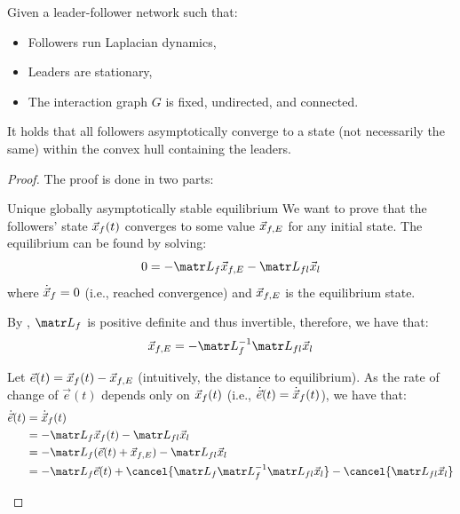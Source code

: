 \begin{theorem} \label{th:containment_optimality} 
    Given a leader-follower network such that:
    \begin{itemize}
        \item Followers run Laplacian dynamics,
        \item Leaders are stationary,
        \item The interaction graph $G$ is fixed, undirected, and connected.
    \end{itemize}
    It holds that all followers asymptotically converge to a state (not necessarily the same) within the convex hull containing the leaders.

    \begin{proof}
        The proof is done in two parts:
        \begin{descriptionlist}
            \item[Unique globally asymptotically stable equilibrium] 
                We want to prove that the followers' state ${\vec{x}}_f(t)$ converges to some value ${\vec{x}}_{f,E}$ for any initial state. The equilibrium can be found by solving:
                \[ 0 = -\lap_f \x_{f,E} - \lap_{fl} \x_l \]
                where $\dot{{\vec{x}}}_f = 0$ (i.e., reached convergence) and ${\vec{x}}_{f,E}$ is the equilibrium state.

                By , $\lap_f$ is positive definite and thus invertible, therefore, we have that:
                \[  \x_{f,E} = -\lap_f^{-1} \lap_{fl} \x_l \]

                Let $\vec{e}(t) = {\vec{x}}_f(t) - {\vec{x}}_{f,E}$ (intuitively, the distance to equilibrium). As the rate of change of $\vec{e}(t)$ depends only on ${\vec{x}}_f(t)$ (i.e., $\dot{\vec{e}}(t) = \dot{{\vec{x}}}_f(t)$), we have that:
                \[
                    \begin{split}
                        \dot{\vec{e}}(t) &= \dot{\x}_f(t) \\
                            &= -\lap_f \x_f(t) - \lap_{fl} \x_l \\
                            &= -\lap_f (\vec{e}(t) + \x_{f,E}) - \lap_{fl} \x_l \\
                            &= -\lap_f \vec{e}(t) + \cancel{\lap_f \lap_f^{-1} \lap_{fl} \x_l} - \cancel{\lap_{fl} \x_l} \\
                    \end{split}
                \]
                

\end{descriptionlist}
\end{proof}
\end{theorem}
